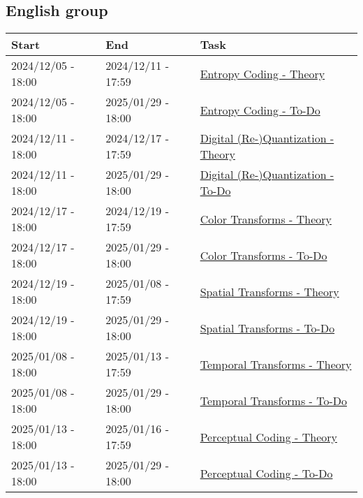 \subsection{English group}
\begin{tabular}{|l|l|l|}
  \hline
  Start & End & Task \\
  \hline
  2024/12/05 - 18:00 & 2024/12/11 - 17:59 & \href{https://sistemas-multimedia.github.io/contents/entropy_coding/}{Entropy Coding - Theory} \\ %
  2024/12/05 - 18:00 & 2025/01/29 - 18:00 & \href{https://sistemas-multimedia.github.io/contents/entropy_coding/#x1-110007}{Entropy Coding - To-Do} \\
  2024/12/11 - 18:00 & 2024/12/17 - 17:59 & \href{https://sistemas-multimedia.github.io/contents/quantization/}{Digital (Re-)Quantization - Theory} \\ %
  2024/12/11 - 18:00 & 2025/01/29 - 18:00 & \href{https://sistemas-multimedia.github.io/contents/quantization/#x1-150008}{Digital (Re-)Quantization - To-Do} \\
  2024/12/17 - 18:00 & 2024/12/19 - 17:59 & \href{https://sistemas-multimedia.github.io/contents/color_transforms/}{Color Transforms - Theory} \\ %
  2024/12/17 - 18:00 & 2025/01/29 - 18:00 & \href{https://sistemas-multimedia.github.io/contents/color_transforms/#x1-100006}{Color Transforms - To-Do} \\
  2024/12/19 - 18:00 & 2025/01/08 - 17:59 & \href{https://sistemas-multimedia.github.io/contents/spatial_transforms/}{Spatial Transforms - Theory} \\ %
  2024/12/19 - 18:00 & 2025/01/29 - 18:00 & \href{https://sistemas-multimedia.github.io/contents/spatial_transforms/#x1-80006}{Spatial Transforms - To-Do} \\
  2025/01/08 - 18:00 & 2025/01/13 - 17:59 & \href{https://sistemas-multimedia.github.io/contents/temporal_transforms/}{Temporal Transforms - Theory} \\ %
  2025/01/08 - 18:00 & 2025/01/29 - 18:00 & \href{https://sistemas-multimedia.github.io/contents/temporal_transforms/#x1-90008}{Temporal Transforms - To-Do} \\
  2025/01/13 - 18:00 & 2025/01/16 - 17:59 & \href{https://sistemas-multimedia.github.io/contents/perceptual_coding/}{Perceptual Coding - Theory} \\ %
  2025/01/13 - 18:00 & 2025/01/29 - 18:00 & \href{https://sistemas-multimedia.github.io/contents/perceptual_coding/#x1-100009}{Perceptual Coding - To-Do} \\

\end{tabular}
